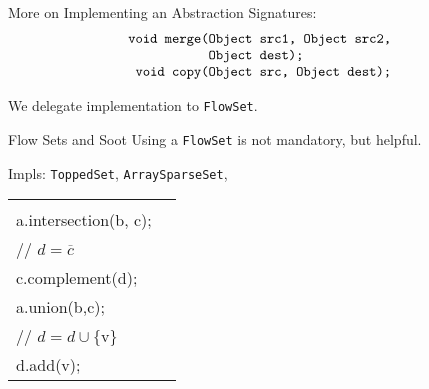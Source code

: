 \begin{slide}{More on Implementing an Abstraction}
Signatures:
{\small 
\[ \mbox{\tt \begin{tabular}{r@{}l}
                 void merge(&Object src1, Object src2,\\
                            &Object dest);\\
                 void copy(&Object src, Object dest);
\end{tabular}}\]
}

We delegate implementation to {\tt FlowSet}.
\end{slide}

\begin{slide}{Flow Sets and Soot}
\vspace*{-0.1in}
Using a {\tt FlowSet} is not mandatory, but helpful.

\quad

Impls: {\tt ToppedSet}, {\tt ArraySparseSet}, \\
\qquad {}

\quad

\begin{tabular}{ll}
\begin{minipage}{0.5\textwidth}
{\small \tt 
// $c = a \cap b$ \\
a.intersection(b, c); \\

// $d = \overline{c}$\\
c.complement(d);
}
\end{minipage} &
\begin{minipage}{0.3\textwidth}
{\small \tt
// $c = a \cup b$ \\
a.union(b,c);\\

// $d = d \cup \{ \mbox{v} \}$\\
d.add(v);
}
\end{minipage}

\end{tabular}

\quad


\end{slide}

